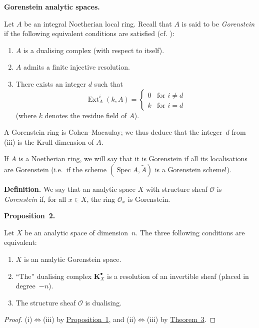\documentclass[british]{article}
\providecommand{\tightlist}{%
\setlength{\itemsep}{0pt}\setlength{\parskip}{0pt}}
\newenvironment{itenv}[1]
  {\phantomsection\par\smallskip\noindent\textbf{#1.}\itshape}
  {\par\smallskip}
\newenvironment{rmenv}[1]
  {\phantomsection\par\smallskip\noindent\textbf{#1.}\rmfamily}
  {\par\smallskip}
\newcommand{\oldpage}[1]{\marginpar{\footnotesize$\Big\vert$ \textit{p.~#1}}}
\begin{document}
\begin{rmenv}{Gorenstein analytic spaces}

Let \(A\) be an integral Noetherian local ring. Recall that \(A\) is
said to be \emph{Gorenstein} if the following equivalent conditions are
satisfied (cf. \autocite{2,7}):

\begin{enumerate}
\def\labelenumi{\roman{enumi}.}
\tightlist
\item
  \(A\) is a dualising complex (with respect to itself).
\item
  \(A\) admits a finite injective resolution.
\item
  There exists an integer \(d\) such that \[
   \operatorname{Ext}_A^i(k,A) =
   \begin{cases}
     0 &\text{for }i\neq d
   \\k &\text{for }i=d
   \end{cases}
      \] (where \(k\) denotes the residue field of \(A\)).
\end{enumerate}

A Gorenstein ring is Cohen--Macaulay; we thus deduce that the
integer~\(d\) from (iii) is the Krull dimension of \(A\).

\oldpage{91}

If \(A\) is a Noetherian ring, we will say that it is Gorenstein if all
its localisations are Gorenstein (i.e.~if the scheme
\((\operatorname{Spec}{A},\widetilde{A})\) is a Gorenstein scheme!).

\begin{rmenv}{Definition}
We say that an analytic space \(X\) with structure sheaf
\({\mathscr{O}}\) is \emph{Gorenstein} if, for all \(x\in X\), the ring
\({\mathscr{O}}_x\) is Gorenstein.

\end{rmenv}

\protect{}\label{proposition-2}
\begin{itenv}{Proposition 2}

Let \(X\) be an analytic space of dimension~\(n\). The three following
conditions are equivalent:

\begin{enumerate}
\def\labelenumi{\roman{enumi}.}
\tightlist
\item
  \(X\) is an analytic Gorenstein space.
\item
  ``The'' dualising complex \(\mathbf{K}_X^\bullet\) is a resolution of
  an invertible sheaf (placed in degree~\(-n\)).
\item
  The structure sheaf \({\mathscr{O}}\) is dualising.
\end{enumerate}

\end{itenv}

\begin{proof}
(i)\(\iff\)(iii) by \hyperref[proposition-1]{Proposition~1}, and
(ii)\(\iff\)(iii) by \hyperref[theorem-3]{Theorem~3}.
\end{proof}

\end{rmenv}
\end{document}

